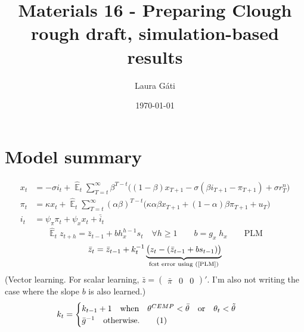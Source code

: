 \documentclass[11pt]{article}
\renewcommand{\[}{\begin{equation}}
\renewcommand{\]}{\end{equation}}
\DeclareMathOperator{\E}{\mathbb{E}}
\newcommand\numberthis{\addtocounter{equation}{1}\tag{\theequation}} %
\begin{document}
\linespread{1.0}

\title{Materials 16 - Preparing Clough rough draft, simulation-based results}
\author{Laura G\'ati} 
\date{\today}
\maketitle


\tableofcontents


\newpage
\section{Model summary}
\begin{align}
x_t &=  -\sigma i_t +\hat{\E}_t \sum_{T=t}^{\infty} \beta^{T-t }\big( (1-\beta)x_{T+1} - \sigma(\beta i_{T+1} - \pi_{T+1}) +\sigma r_T^n \big)  \label{prestons18}  \\
\pi_t &= \kappa x_t +\hat{\E}_t \sum_{T=t}^{\infty} (\alpha\beta)^{T-t }\big( \kappa \alpha \beta x_{T+1} + (1-\alpha)\beta \pi_{T+1} + u_T\big) \label{prestons19}  \\
i_t &= \psi_{\pi}\pi_t + \psi_{x} x_t  + \bar{i}_t \label{TR}
\end{align}
\begin{equation}
\hat{\E}_t z_{t+h} =  \bar{z}_{t-1} + bh_x^{h-1}s_t  \quad \forall h\geq 1 \quad \quad b = g_x\; h_x \quad \quad \text{PLM} \label{PLM}
\end{equation}
\begin{equation}
\bar{z}_{t} = \bar{z}_{t-1} +k_t^{-1}\underbrace{\big(z_{t} -(\bar{z}_{t-1}+bs_{t-1}) \big)}_{\text{fcst error using (\ref{PLM})} } 
\end{equation}
(Vector learning. For scalar learning, $\bar{z}= \begin{pmatrix} \bar{\pi} & 0 & 0\end{pmatrix}' $. I'm also not writing the case where the slope $b$ is also learned.)
 \begin{align*}
k_t & = \begin{cases} k_{t-1}+1 \quad \text{when} \quad \theta^{CEMP} < \bar{\theta} \quad \text{or}  \quad  \theta_t < \tilde{\theta}  \\ \bar{g}^{-1}  \quad \text{otherwise.}\numberthis
\end{cases} 
\end{align*}
\end{document}
